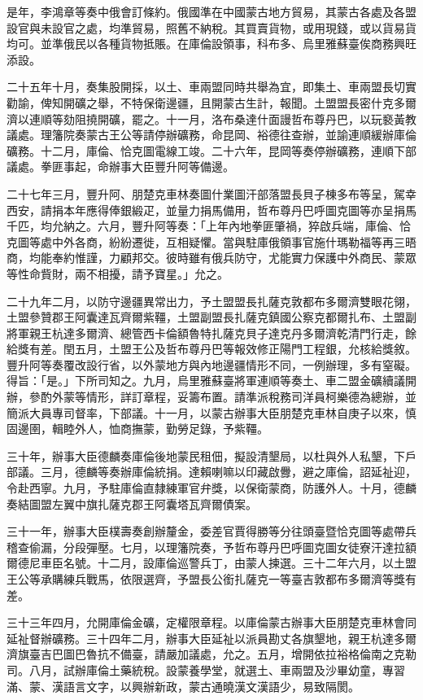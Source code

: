 \begin{pinyinscope}
是年，李鴻章等奏中俄會訂條約。俄國準在中國蒙古地方貿易，其蒙古各處及各盟設官與未設官之處，均準貿易，照舊不納稅。其買賣貨物，或用現錢，或以貨易貨均可。並準俄民以各種貨物抵賬。在庫倫設領事，科布多、烏里雅蘇臺俟商務興旺添設。

二十五年十月，奏集股開採，以土、車兩盟同時共舉為宜，即集土、車兩盟長切實勸諭，俾知開礦之舉，不特保衛邊疆，且開蒙古生計，報聞。土盟盟長密什克多爾濟以連順等劾阻撓開礦，罷之。十一月，洛布桑達什面謾哲布尊丹巴，以玩褻黃教議處。理籓院奏蒙古王公等請停辦礦務，命昆岡、裕德往查辦，並諭連順緩辦庫倫礦務。十二月，庫倫、恰克圖電線工竣。二十六年，昆岡等奏停辦礦務，連順下部議處。拳匪事起，命辦事大臣豐升阿等備邊。

二十七年三月，豐升阿、朋楚克車林奏圖什業圖汗部落盟長貝子棟多布等呈，駕幸西安，請捐本年應得俸銀緞疋，並量力捐馬備用，哲布尊丹巴呼圖克圖等亦呈捐馬千匹，均允納之。六月，豐升阿等奏：「上年內地拳匪肇禍，猝啟兵端，庫倫、恰克圖等處中外各商，紛紛遷徙，互相疑懼。當與駐庫俄領事官施什瑪勒福等再三晤商，均能奉約惟謹，力顧邦交。彼時雖有俄兵防守，尤能實力保護中外商民、蒙眾等性命貲財，兩不相擾，請予寶星。」允之。

二十九年二月，以防守邊疆異常出力，予土盟盟長扎薩克敦都布多爾濟雙眼花翎，土盟參贊郡王阿囊達瓦齊爾紫韁，土盟副盟長扎薩克鎮國公察克都爾扎布、土盟副將軍親王杭達多爾濟、總管西卡倫額魯特扎薩克貝子達克丹多爾濟乾清門行走，餘給獎有差。閏五月，土盟王公及哲布尊丹巴等報效修正陽門工程銀，允核給獎敘。豐升阿等奏覆改設行省，以外蒙地方與內地邊疆情形不同，一例辦理，多有窒礙。得旨：「是。」下所司知之。九月，烏里雅蘇臺將軍連順等奏土、車二盟金礦續議開辦，參酌外蒙等情形，詳訂章程，妥籌布置。請準派稅務司洋員柯樂德為總辦，並簡派大員專司督率，下部議。十一月，以蒙古辦事大臣朋楚克車林自庚子以來，慎固邊圉，輯睦外人，恤商撫蒙，勤勞足錄，予紫韁。

三十年，辦事大臣德麟奏庫倫後地蒙民租佃，擬設清墾局，以杜與外人私墾，下戶部議。三月，德麟等奏辦庫倫統捐。達賴喇嘛以印藏啟釁，避之庫倫，詔延祉迎，令赴西寧。九月，予駐庫倫直隸練軍官弁獎，以保衛蒙商，防護外人。十月，德麟奏結圖盟左翼中旗扎薩克郡王阿囊塔瓦齊爾債案。

三十一年，辦事大臣樸壽奏創辦釐金，委差官賈得勝等分往頭臺暨恰克圖等處帶兵稽查偷漏，分段彈壓。七月，以理籓院奏，予哲布尊丹巴呼圖克圖女徒寮汗達拉額爾德尼車臣名號。十二月，設庫倫巡警兵丁，由蒙人揀選。三十二年六月，以土盟王公等承購練兵戰馬，依限選齊，予盟長公銜扎薩克一等臺吉敦都布多爾濟等獎有差。

三十三年四月，允開庫倫金礦，定權限章程。以庫倫蒙古辦事大臣朋楚克車林會同延祉督辦礦務。三十四年二月，辦事大臣延祉以派員勘丈各旗墾地，親王杭達多爾濟旗臺吉巴圖巴魯抗不備臺，請嚴加議處，允之。五月，增開依拉裕格倫南之克勒司。八月，試辦庫倫土藥統稅。設蒙養學堂，就選土、車兩盟及沙畢幼童，專習滿、蒙、漢語言文字，以興辦新政，蒙古通曉漢文漢語少，易致隔閡。


\end{pinyinscope}
